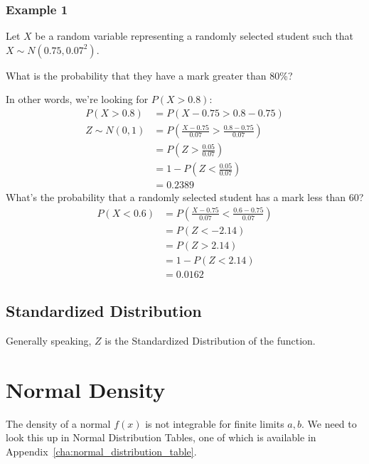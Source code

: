                 \subsubsection{Example 1} %
                \label{ssub:example_1}
                    Let $X$ be a random variable representing a randomly selected student such that $X \sim N(0.75, 0.07^2)$.

                    What is the probability that they have a mark greater than 80\%?

                    In other words, we're looking for $P(X > 0.8)$:
                    \begin{align*}
                        P(X > 0.8) &= P(X - 0.75 > 0.8 - 0.75) \\
                        Z \sim N(0, 1) &= P\left(\frac{X - 0.75}{0.07} > \frac{0.8 - 0.75}{0.07}\right) \\
                        &= P\left(Z > \frac{0.05}{0.07}\right) \\
                        &= 1 - P\left(Z < \frac{0.05}{0.07}\right) \\
                        &= 0.2389
                    \end{align*}
                    What's the probability that a randomly selected student has a mark less than $60$?
                    \begin{align*}
                        P(X < 0.6) &= P\left(\frac{X-0.75}{0.07} < \frac{0.6-0.75}{0.07}\right) \\
                        &= P(Z < -2.14) \\
                        &= P(Z > 2.14) \\
                        &= 1 - P(Z < 2.14) \\
                        &= 0.0162
                    \end{align*}
                \subsection{Standardized Distribution} %
                \label{sub:standardized_distribution}
                    Generally speaking, $Z$ is the Standardized Distribution of the function.
            \section{Normal Density} %
            \label{sec:normal_density}
                The density of a normal $f(x)$ is not integrable for finite limits $a, b$.
                We need to look this up in Normal Distribution Tables, one of which is available in Appendix~\ref{cha:normal_distribution_table}.
